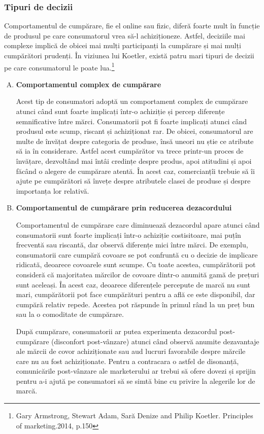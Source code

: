 \documentclass[a4paper, 12pt]{article}
\begin{document}
			\subsubsection{Tipuri de decizii}
				\quad Comportamentul de cumpărare, fie el online sau fizic, diferă foarte mult în funcție de produsul pe care consumatorul vrea să-l achiziționeze. Astfel, deciziile mai complexe implică de obicei mai mulți participanți la cumpărare și mai mulți cumpărători prudenți. În viziunea lui Koetler, există patru mari tipuri de decizii pe care consumatorul le poate lua.\footnote{Gary Armstrong, Stewart Adam, Sară Denize and Philip Koetler. Principles of marketing.2014, p.150}
			\begin{enumerate}[A)]
				\item \textbf{Comportamentul complex de cumpărare}
				
				\quad Acest tip de consumatori adoptă un comportament complex de cumpărare atunci când sunt foarte implicați într-o achiziție și percep diferențe semnificative între mărci. Consumatorii pot fi foarte implicați atunci când produsul este scump, riscant și achiziționat rar. De obicei, consumatorul are multe de învățat despre categoria de produse, însă uneori nu știe ce atribute să ia în considerare. Astfel acest cumpărător va trece printr-un proces de învățare, dezvoltând mai întâi credințe despre produs, apoi atitudini și apoi făcând o alegere de cumpărare atentă. În acest caz, comercianțîi trebuie să îi ajute pe cumpărători să învețe despre atributele clasei de produse și despre importanța lor relativă.
				
				\item \textbf{Comportamentul de cumpărare prin reducerea dezacordului}
				
				\quad Comportamentul de cumpărare care diminuează dezacordul apare atunci când consumatorii sunt foarte implicați într-o achiziție costisitoare, mai puțîn frecventă sau riscantă, dar observă diferențe mici între mărci. De exemplu, consumatorii care cumpără covoare se pot confruntă cu o decizie de implicare ridicată, deoarece covoarele sunt scumpe. Cu toate acestea, cumpărătorii pot consideră că majoritatea mărcilor de covoare dintr-o anumită gamă de prețuri sunt aceleași. În acest caz, deoarece diferențele percepute de marcă nu sunt mari, cumpărătorii pot face cumpărături pentru a află ce este disponibil, dar cumpără relativ repede. Acestea pot răspunde în primul rând la un preț bun sau la o comoditate de cumpărare.
				
				\quad După cumpărare, consumatorii ar putea experimenta dezacordul post-cumpărare (disconfort post-vânzare) atunci când observă anumite dezavantaje ale mărcii de covor achiziționate sau aud lucruri favorabile despre mărcile care nu au fost achiziționate. Pentru a contracara o astfel de disonanță, comunicările post-vânzare ale marketerului ar trebui să ofere dovezi și sprijin pentru a-i ajută pe consumatori să se simtă bine cu privire la alegerile lor de marcă.
				

\end{enumerate}
\end{document}
